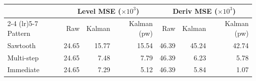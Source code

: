\begin{tabular}{l rrrrrr}
\toprule
& \multicolumn{3}{c}{Level MSE ($\times 10^3$)} & \multicolumn{3}{c}{Deriv MSE ($\times 10^3$)} \\
\cmidrule(lr){2-4} \cmidrule(lr){5-7}
Pattern & Raw & Kalman & Kalman (pw) & Raw & Kalman & Kalman (pw) \\
\midrule
Sawtooth     & 24.65 & 15.77 & 15.54 & 46.39 & 45.24 & 42.74 \\
Multi-step   & 24.65 & 7.48 & 7.79 & 46.39 & 6.23 & 5.78 \\
Immediate    & 24.65 & 7.29 & 5.12 & 46.39 & 5.84 & 1.07 \\
\bottomrule
\end{tabular}
